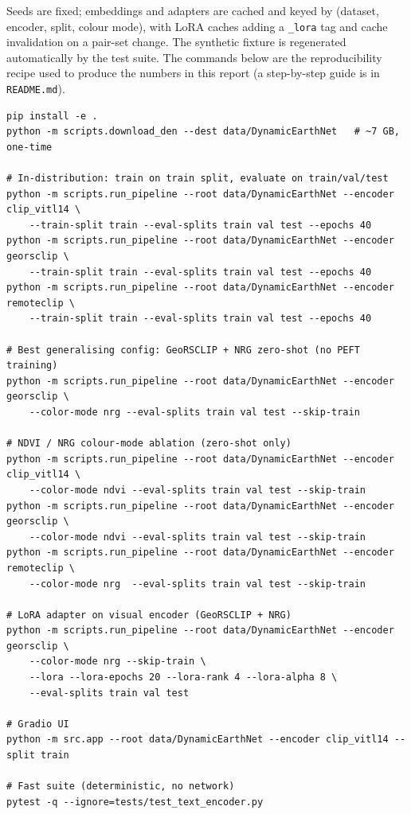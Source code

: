 \documentclass{article}
\begin{document}
Seeds are fixed; embeddings and adapters are cached and keyed by
(dataset, encoder, split, colour mode), with LoRA caches adding a \texttt{\_lora}
tag and cache invalidation on a pair-set change. The synthetic fixture is
regenerated automatically by the test suite. The commands below are the
reproducibility recipe used to produce the numbers in this report (a
step-by-step guide is in \texttt{README.md}).

{\footnotesize
\begin{verbatim}
pip install -e .
python -m scripts.download_den --dest data/DynamicEarthNet   # ~7 GB, one-time

# In-distribution: train on train split, evaluate on train/val/test
python -m scripts.run_pipeline --root data/DynamicEarthNet --encoder clip_vitl14 \
    --train-split train --eval-splits train val test --epochs 40
python -m scripts.run_pipeline --root data/DynamicEarthNet --encoder georsclip \
    --train-split train --eval-splits train val test --epochs 40
python -m scripts.run_pipeline --root data/DynamicEarthNet --encoder remoteclip \
    --train-split train --eval-splits train val test --epochs 40

# Best generalising config: GeoRSCLIP + NRG zero-shot (no PEFT training)
python -m scripts.run_pipeline --root data/DynamicEarthNet --encoder georsclip \
    --color-mode nrg --eval-splits train val test --skip-train

# NDVI / NRG colour-mode ablation (zero-shot only)
python -m scripts.run_pipeline --root data/DynamicEarthNet --encoder clip_vitl14 \
    --color-mode ndvi --eval-splits train val test --skip-train
python -m scripts.run_pipeline --root data/DynamicEarthNet --encoder georsclip \
    --color-mode ndvi --eval-splits train val test --skip-train
python -m scripts.run_pipeline --root data/DynamicEarthNet --encoder remoteclip \
    --color-mode nrg  --eval-splits train val test --skip-train

# LoRA adapter on visual encoder (GeoRSCLIP + NRG)
python -m scripts.run_pipeline --root data/DynamicEarthNet --encoder georsclip \
    --color-mode nrg --skip-train \
    --lora --lora-epochs 20 --lora-rank 4 --lora-alpha 8 \
    --eval-splits train val test

# Gradio UI
python -m src.app --root data/DynamicEarthNet --encoder clip_vitl14 --split train

# Fast suite (deterministic, no network)
pytest -q --ignore=tests/test_text_encoder.py
\end{verbatim}
}
\end{document}
